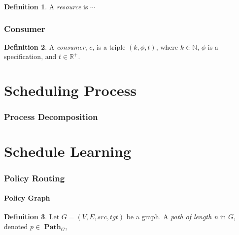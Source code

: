 \documentclass{article}
\theoremstyle{definition}
\newtheorem{definition}{Definition}[section]
\theoremstyle{remark}
\theoremstyle{theorem}
\theoremstyle{definition}
\newcommand{\path}[1]{$\mathbf{Path}_{#1}$}
\begin{document}
	\begin{definition}
		A \emph{resource} is $\cdots$
	\end{definition}
	
	\section{Consumer}
	
	\begin{definition}
		A \emph{consumer}, $c$, is a triple $(k, \phi, t)$, where $k \in \mathbb{N}$, $\phi$ is a specification, and $t \in \mathbb{R}^{+}$. 
	\end{definition}
	
	\part{Scheduling Process}
	
	\section{Process Decomposition}
	
	
	\part{Schedule Learning}
	
	\section{Policy Routing}
	
	\subsection{Policy Graph}
	
	\begin{definition}
		Let $G = (V, E, src, tgt)$ be a graph. A \emph{path of length n} in $G$, denoted $p \in$ \path{G}, 
	\end{definition}
\end{document}
